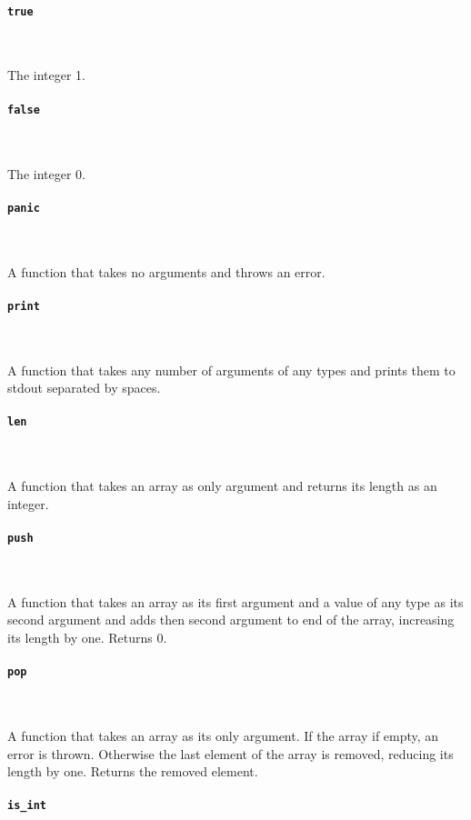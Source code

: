 \paragraph{\texttt{true}} \

The integer 1.

\paragraph{\texttt{false}} \

The integer 0.

\paragraph{\texttt{panic}} \

A function that takes no arguments and throws an error.

\paragraph{\texttt{print}} \

A function that takes any number of arguments of any types and prints them to stdout separated by spaces.

\paragraph{\texttt{len}} \

A function that takes an array as only argument and returns its length as an integer.

\paragraph{\texttt{push}} \

A function that takes an array as its first argument and a value of any type as its second argument and adds then second argument to end of the array, increasing its length by one. Returns 0.

\paragraph{\texttt{pop}} \

A function that takes an array as its only argument. If the array if empty, an error is thrown. Otherwise the last element of the array is removed, reducing its length by one. Returns the removed element.

\paragraph{\texttt{is\_int}} \

